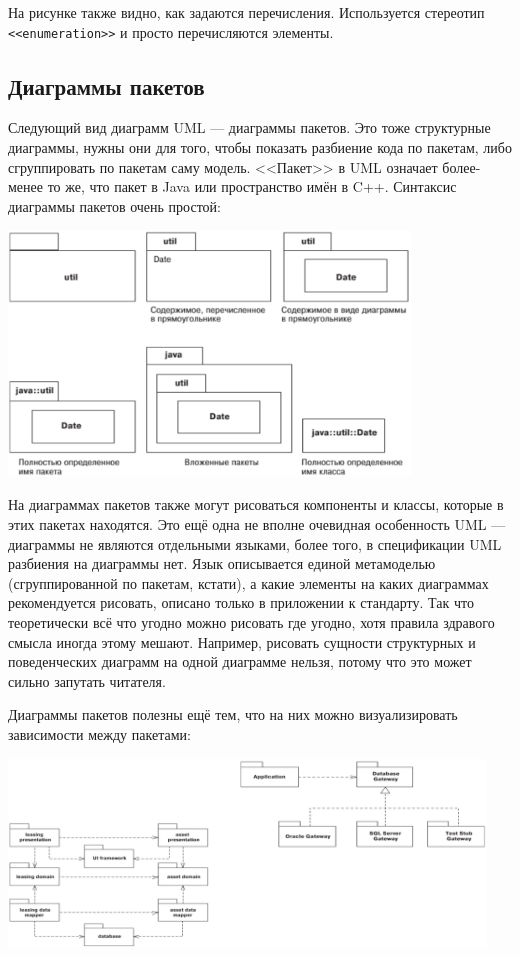 \documentclass{../../text-style}
\begin{document}
На рисунке также видно, как задаются перечисления. Используется стереотип \verb|<<enumeration>>| и просто перечисляются элементы.

\subsection{Диаграммы пакетов}

Следующий вид диаграмм UML --- диаграммы пакетов. Это тоже структурные диаграммы, нужны они для того, чтобы показать разбиение кода по пакетам, либо сгруппировать по пакетам саму модель. <<Пакет>> в UML означает более-менее то же, что пакет в Java или пространство имён в C++. Синтаксис диаграммы пакетов очень простой:

\begin{center}
    \includegraphics[width=0.8\textwidth]{packageDiagrams.png}
\end{center}

На диаграммах пакетов также могут рисоваться компоненты и классы, которые в этих пакетах находятся. Это ещё одна не вполне очевидная особенность UML --- диаграммы не являются отдельными языками, более того, в спецификации UML разбиения на диаграммы нет. Язык описывается единой метамоделью (сгруппированной по пакетам, кстати), а какие элементы на каких диаграммах рекомендуется рисовать, описано только в приложении к стандарту. Так что теоретически всё что угодно можно рисовать где угодно, хотя правила здравого смысла иногда этому мешают. Например, рисовать сущности структурных и поведенческих диаграмм на одной диаграмме нельзя, потому что это может сильно запутать читателя.

Диаграммы пакетов полезны ещё тем, что на них можно визуализировать зависимости между пакетами:

\begin{center}
    \includegraphics[width=0.95\textwidth]{packageDependencies.png}
\end{center}
\end{document}
